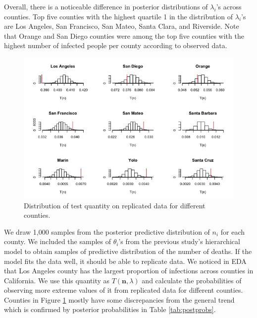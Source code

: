 \documentclass[11pt,twocolumn]{asaproc}
\begin{document}
Overall, there is a noticeable difference in posterior distributions of $\lambda_i$'s across counties. Top five counties with the highest quartile 1 in the distribution of $\lambda_i$'s are Los Angeles, San Francisco, San Mateo, Santa Clara, and Riverside. Note that Orange and San Diego counties were among the top five counties with the highest number of infected people per county according to observed data. 


\begin{figure}[t]
\centering\includegraphics[scale=.30]{quantities.jpeg}
\caption{Distribution of test quantity on replicated data for different counties.}
\label{fig:quantities}
\end{figure}


We draw 1,000 samples from the posterior predictive distribution of $n_i$ for each county. We included the samples of $\theta_i$'s from the previous study's hierarchical model to obtain samples of predictive distribution of the number of deaths. If the model fits the data well, it should be able to replicate data. We noticed in EDA that Los Angeles county has the largest proportion of infections across counties in California. We use this quantity as $T(\mathbf{n}, \lambda)$ and calculate the probabilities of observing more extreme values of it from replicated data for different counties. Counties in Figure \ref{fig:quantities} mostly have some discrepancies from the general trend which is confirmed by posterior probabilities in Table \ref{tab:postprobs}. 

 
 
\end{document}
